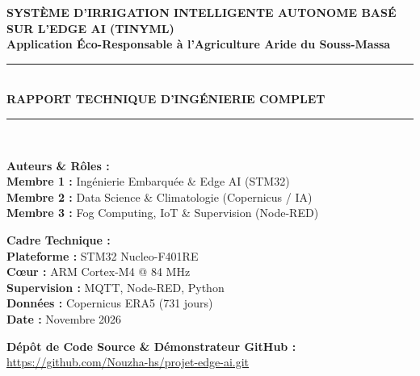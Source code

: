 \documentclass[11pt,a4paper]{report}
\begin{document}
\begin{titlepage}
    \centering
    \vspace*{1cm}
    
    {\Huge \textbf{\color{primary}SYSTÈME D'IRRIGATION INTELLIGENTE AUTONOME BASÉ SUR L'EDGE AI (TINYML)}}\\[0.5cm]
    {\LARGE \textbf{\color{secondary}Application Éco-Responsable à l'Agriculture Aride du Souss-Massa}}\\[1.5cm]
    
    \rule{\linewidth}{1.5pt}\\[0.4cm]
    {\Large \textbf{RAPPORT TECHNIQUE D'INGÉNIERIE COMPLET}}\\[0.2cm]
    \rule{\linewidth}{1.5pt}\\[2cm]
    
    \begin{minipage}{0.48\textwidth}
        \textbf{\large Auteurs \& Rôles :}\\[0.3cm]
        \textbf{Membre 1 :} Ingénierie Embarquée \& Edge AI (STM32)\\
        \textbf{Membre 2 :} Data Science \& Climatologie (Copernicus / IA)\\
        \textbf{Membre 3 :} Fog Computing, IoT \& Supervision (Node-RED)
    \end{minipage}
    \hfill
    \begin{minipage}{0.48\textwidth}
        \flushright
        \textbf{\large Cadre Technique :}\\[0.3cm]
        \textbf{Plateforme :} STM32 Nucleo-F401RE\\
        \textbf{Cœur :} ARM Cortex-M4 @ 84 MHz\\
        \textbf{Supervision :} MQTT, Node-RED, Python\\
        \textbf{Données :} Copernicus ERA5 (731 jours)\\
        \textbf{Date :} Novembre 2026
    \end{minipage}
    
    \vfill
    
    \begin{tcolorbox}[colback=primary!5,colframe=primary,arc=3mm]
        \centering
        \textbf{Dépôt de Code Source & Démonstrateur GitHub :} \\
        \href{https://github.com/Nouzha-hs/projet-edge-ai.git}{\ttfamily https://github.com/Nouzha-hs/projet-edge-ai.git}
    \end{tcolorbox}
    
    \vspace*{0.5cm}
\end{titlepage}
\end{document}
